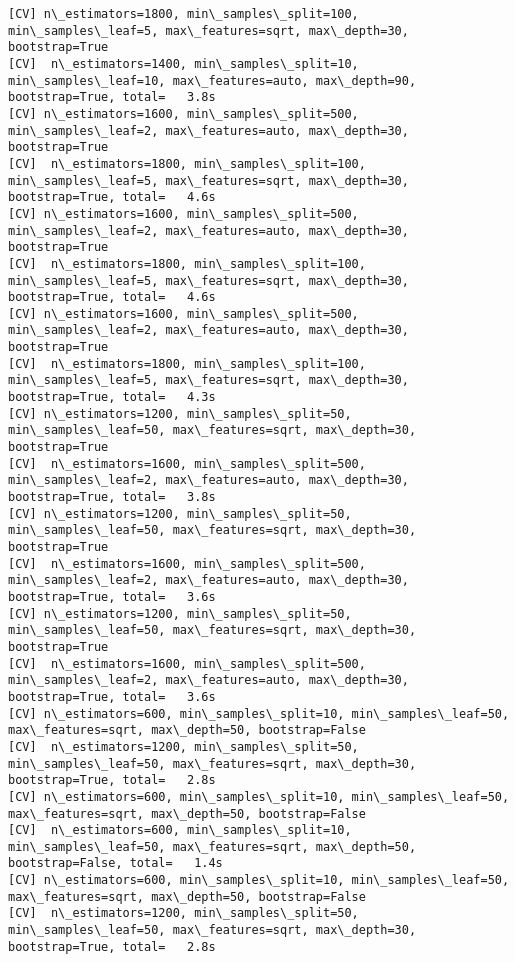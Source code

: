 \documentclass[11pt]{article}
\begin{document}
\begin{Verbatim}[commandchars=\\\{\}]
[CV] n\_estimators=1800, min\_samples\_split=100, min\_samples\_leaf=5, max\_features=sqrt, max\_depth=30, bootstrap=True 
[CV]  n\_estimators=1400, min\_samples\_split=10, min\_samples\_leaf=10, max\_features=auto, max\_depth=90, bootstrap=True, total=   3.8s
[CV] n\_estimators=1600, min\_samples\_split=500, min\_samples\_leaf=2, max\_features=auto, max\_depth=30, bootstrap=True 
[CV]  n\_estimators=1800, min\_samples\_split=100, min\_samples\_leaf=5, max\_features=sqrt, max\_depth=30, bootstrap=True, total=   4.6s
[CV] n\_estimators=1600, min\_samples\_split=500, min\_samples\_leaf=2, max\_features=auto, max\_depth=30, bootstrap=True 
[CV]  n\_estimators=1800, min\_samples\_split=100, min\_samples\_leaf=5, max\_features=sqrt, max\_depth=30, bootstrap=True, total=   4.6s
[CV] n\_estimators=1600, min\_samples\_split=500, min\_samples\_leaf=2, max\_features=auto, max\_depth=30, bootstrap=True 
[CV]  n\_estimators=1800, min\_samples\_split=100, min\_samples\_leaf=5, max\_features=sqrt, max\_depth=30, bootstrap=True, total=   4.3s
[CV] n\_estimators=1200, min\_samples\_split=50, min\_samples\_leaf=50, max\_features=sqrt, max\_depth=30, bootstrap=True 
[CV]  n\_estimators=1600, min\_samples\_split=500, min\_samples\_leaf=2, max\_features=auto, max\_depth=30, bootstrap=True, total=   3.8s
[CV] n\_estimators=1200, min\_samples\_split=50, min\_samples\_leaf=50, max\_features=sqrt, max\_depth=30, bootstrap=True 
[CV]  n\_estimators=1600, min\_samples\_split=500, min\_samples\_leaf=2, max\_features=auto, max\_depth=30, bootstrap=True, total=   3.6s
[CV] n\_estimators=1200, min\_samples\_split=50, min\_samples\_leaf=50, max\_features=sqrt, max\_depth=30, bootstrap=True 
[CV]  n\_estimators=1600, min\_samples\_split=500, min\_samples\_leaf=2, max\_features=auto, max\_depth=30, bootstrap=True, total=   3.6s
[CV] n\_estimators=600, min\_samples\_split=10, min\_samples\_leaf=50, max\_features=sqrt, max\_depth=50, bootstrap=False 
[CV]  n\_estimators=1200, min\_samples\_split=50, min\_samples\_leaf=50, max\_features=sqrt, max\_depth=30, bootstrap=True, total=   2.8s
[CV] n\_estimators=600, min\_samples\_split=10, min\_samples\_leaf=50, max\_features=sqrt, max\_depth=50, bootstrap=False 
[CV]  n\_estimators=600, min\_samples\_split=10, min\_samples\_leaf=50, max\_features=sqrt, max\_depth=50, bootstrap=False, total=   1.4s
[CV] n\_estimators=600, min\_samples\_split=10, min\_samples\_leaf=50, max\_features=sqrt, max\_depth=50, bootstrap=False 
[CV]  n\_estimators=1200, min\_samples\_split=50, min\_samples\_leaf=50, max\_features=sqrt, max\_depth=30, bootstrap=True, total=   2.8s

\end{Verbatim}
\end{document}

